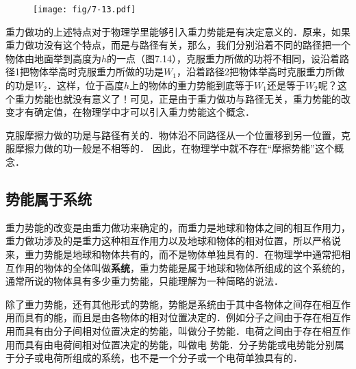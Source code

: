 \begin{figure}[htp]
    \centering
    \texttt{[image: fig/7-13.pdf]}
    \caption{}
\end{figure}

重力做功的上述特点对于物理学里能够引入重力势能是有决定意义的．原来，如果重力做功没有这个特点，而是与路径有关，那么，我们分别沿着不同的路径把一个物体由地面举到高度为$h$的一点（图7.14），克服重力所做的功将不相同，设沿着路径1把物体举高时克服重力所做的功是$W_1$，沿着路径2把物体举高时克服重力所做的功是$W_2$．这样，位于高度$h$上的物体的重力势能到底等于$W_1$还是等于$W_2$呢？这个重力势能也就没有意义了！可见，正是由于重力做功与路径无关，重力势能的改变才有确定值，在物理学中才可以引入重力势能这个概念．
\begin{figure}[htp]\centering
{}
\caption{}
\end{figure}

克服摩擦力做的功是与路径有关的．物体沿不同路径从一个位置移到另一位置，克服摩擦力做的功一般是不相等的．
因此，在物理学中就不存在“摩擦势能”这个概念．


\subsection{势能属于系统} 

重力势能的改变是由重力做功来确定的，而重力是地球和物体之间的相互作用力，重力做功涉及的是重力这种相互作用力以及地球和物体的相对位置，所以严格说来，重力势能是地球和物体共有的，而不是物体单独具有的．在物理学中通常把相互作用的物体的全体叫做\textbf{系统}，重力势能是属于地球和物体所组成的这个系统的，通常所说的物体具有多少重力势能，只能理解为一种简略的说法．

除了重力势能，还有其他形式的势能，势能是系统由于其中各物体之间存在相互作用而具有的能，而且是由各物体的相对位置决定的．例如分子之间由于存在相互作用而具有由分子间相对位置决定的势能，叫做分子势能．电荷之间由于存在相互作用而具有由电荷间相对位置决定的势能，叫做电
势能．分子势能或电势能分别属于分子或电荷所组成的系统，也不是一个分子或一个电荷单独具有的．

